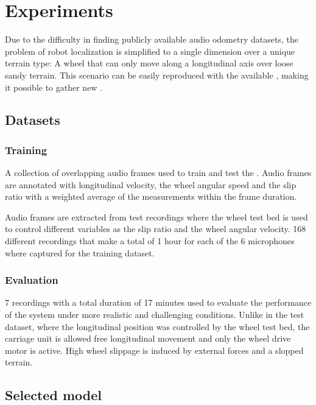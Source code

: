 \section{Experiments} \label{sec:experiments}

Due to the difficulty in finding publicly available audio odometry datasets,
the problem of robot localization is simplified to a single dimension over a
unique terrain type: A wheel that can only move along a longitudinal axis over
loose sandy terrain. This scenario can be easily reproduced with the available
, making it possible to gather new
. 



\subsection{Datasets} \label{subsec:datasets}

\subsubsection{Training} \label{subsubsec:training-dataset} A collection of
overlapping audio frames used to train and test the
. Audio frames are annotated with longitudinal
velocity, the wheel angular speed and the slip ratio with a weighted average of
the measurements within the frame duration.

Audio frames are extracted from test recordings where the wheel test bed is
used to control different variables as the slip ratio and the wheel angular
velocity. 168 different recordings that make a total of 1 hour for each of the
6 microphones where captured for the training dataset.  

\subsubsection{Evaluation} \label{subsubsec:evaluatio-dataset} 7 recordings
with a total duration of 17 minutes used to evaluate the performance of the
system under more realistic and challenging conditions. Unlike in the test
dataset, where the longitudinal position was controlled by the wheel test bed,
the carriage unit is allowed free longitudinal movement and only the wheel
drive motor is active. High wheel slippage is induced by external forces and
a slopped terrain.


\subsection{Selected model} \label{subsec:selected-model} 

